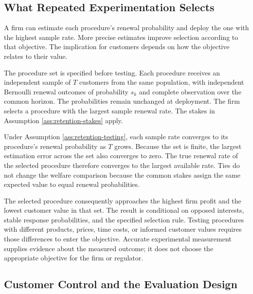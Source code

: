 \hypertarget{M08-what-repeated-experimentation-selects}{%
\subsection{What Repeated Experimentation
Selects}\label{M08-what-repeated-experimentation-selects}}

\noindent \noindent A firm can estimate each procedure's renewal probability and
deploy the one with the highest sample rate. More precise estimates
improve selection according to that objective. The implication for
customers depends on how the objective relates to their value.

\begin{assumption}
\label{ass:retention-testing}
The procedure set is specified before testing. Each procedure receives an independent sample of $T$ customers from the same population, with independent Bernoulli renewal outcomes of probability $s_k$ and complete observation over the common horizon. The probabilities remain unchanged at deployment. The firm selects a procedure with the largest sample renewal rate. The stakes in Assumption \ref{ass:retention-stakes} apply.
\end{assumption}

\noindent Under Assumption \ref{ass:retention-testing}, each sample rate
converges to its procedure's renewal probability as \(T\) grows. Because
the set is finite, the largest estimation error across the set also
converges to zero. The true renewal rate of the selected procedure
therefore converges to the largest available rate. Ties do not change
the welfare comparison because the common stakes assign the same
expected value to equal renewal probabilities.

The selected procedure consequently approaches the highest firm profit
and the lowest customer value in that set. The result is conditional on
opposed interests, stable response probabilities, and the specified
selection rule. Testing procedures with different products, prices, time
costs, or informed customer values requires those differences to enter
the objective. Accurate experimental measurement supplies evidence about
the measured outcome; it does not choose the appropriate objective for
the firm or regulator.

\hypertarget{M08-customer-control-and-the-evaluation-design}{%
\subsection{Customer Control and the Evaluation
Design}\label{M08-customer-control-and-the-evaluation-design}}

